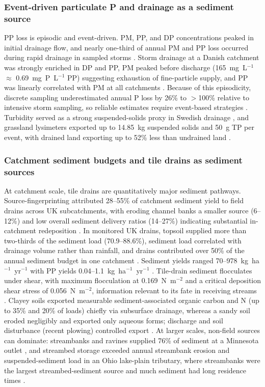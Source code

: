 \documentclass[11pt]{article}
\begin{document}
\subsubsection{Event-driven particulate P and drainage as a sediment source}

PP loss is episodic and event-driven. PM, PP, and DP concentrations peaked in initial
drainage flow, and nearly one-third of annual PM and PP loss occurred during rapid
drainage in sampled storms \parencite{Laubel1999}. Storm drainage at a Danish
catchment was strongly enriched in DP and PP, PM peaked before discharge (165~mg~L$^{-1}$
$\approx$ 0.69~mg~P~L$^{-1}$ PP) suggesting exhaustion of fine-particle supply, and PP
was linearly correlated with PM at all catchments \parencite{Grant1996}. Because of
this episodicity, discrete sampling underestimated annual P loss by 26\% to $>$100\%
relative to intensive storm sampling, so reliable estimates require event-based
strategies \parencite{Grant1996}. Turbidity served as a strong suspended-solids proxy
in Swedish drainage \parencite{Ulén2018}, and grassland lysimeters exported up to
14.85~kg suspended solids and 50~g TP per event, with drained land exporting up to
52\% less than undrained land \parencite{Bilotta2008}.

\subsubsection{Catchment sediment budgets and tile drains as sediment sources}

At catchment scale, tile drains are quantitatively major sediment pathways.
Source-fingerprinting attributed 28--55\% of catchment sediment yield to field drains
across UK subcatchments, with eroding channel banks a smaller source (6--12\%) and low
overall sediment delivery ratios (14--27\%) indicating substantial in-catchment
redeposition \parencite{Walling2002}. In monitored UK drains, topsoil supplied more
than two-thirds of the sediment load (70.9--88.6\%), sediment load correlated with
drainage volume rather than rainfall, and drains contributed over 50\% of the annual
sediment budget in one catchment \parencite{Chapman2005}. Sediment yields ranged
70--978~kg~ha$^{-1}$~yr$^{-1}$ with PP yields 0.04--1.1~kg~ha$^{-1}$~yr$^{-1}$
\parencite{Chapman2005}. Tile-drain sediment flocculates under shear, with maximum
flocculation at 0.169~N~m$^{-2}$ and a critical deposition shear stress of
0.056~N~m$^{-2}$, information relevant to its fate in receiving streams
\parencite{Stone1997}. Clayey soils exported measurable sediment-associated organic
carbon and N (up to 35\% and 20\% of loads) chiefly via subsurface drainage, whereas a
sandy soil eroded negligibly and exported only aqueous forms; discharge and soil
disturbance (recent plowing) controlled export \parencite{Manninen2023}. At larger
scales, non-field sources can dominate: streambanks and ravines supplied 76\% of
sediment at a Minnesota outlet \parencite{Dalzell2018}, and streambed storage exceeded
annual streambank erosion and suspended-sediment load in an Ohio lake-plain tributary,
where streambanks were the largest streambed-sediment source and much sediment had long
residence times \parencite{Williamson2025}.
\end{document}
